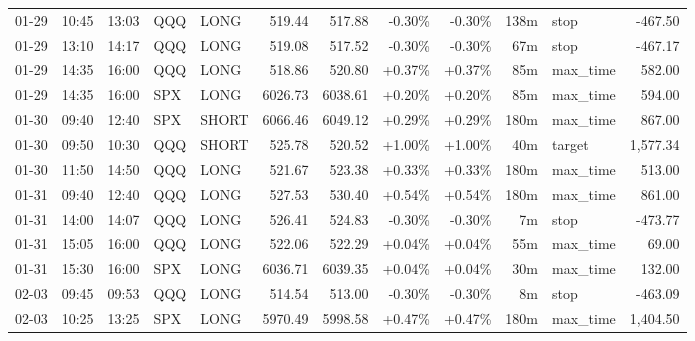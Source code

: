 \documentclass[11pt,a4paper,twoside]{article}
\begin{document}
\begin{center}
\begin{longtable}{>{\color{txtmain}}l l l l l r r r r r >{\color{txtmain}}l r}
01-29 & 10:45 & 13:03 & QQQ & LONG & 519.44 & 517.88 & \textcolor{lossred}{-0.30\%} & \textcolor{lossred}{-0.30\%} & 138m & stop & \textcolor{lossred}{-467.50} \\
01-29 & 13:10 & 14:17 & QQQ & LONG & 519.08 & 517.52 & \textcolor{lossred}{-0.30\%} & \textcolor{lossred}{-0.30\%} & 67m & stop & \textcolor{lossred}{-467.17} \\
01-29 & 14:35 & 16:00 & QQQ & LONG & 518.86 & 520.80 & \textcolor{wingreen}{+0.37\%} & \textcolor{wingreen}{+0.37\%} & 85m & max\_time & \textcolor{wingreen}{582.00} \\
01-29 & 14:35 & 16:00 & SPX & LONG & 6026.73 & 6038.61 & \textcolor{wingreen}{+0.20\%} & \textcolor{wingreen}{+0.20\%} & 85m & max\_time & \textcolor{wingreen}{594.00} \\
01-30 & 09:40 & 12:40 & SPX & SHORT & 6066.46 & 6049.12 & \textcolor{wingreen}{+0.29\%} & \textcolor{wingreen}{+0.29\%} & 180m & max\_time & \textcolor{wingreen}{867.00} \\
01-30 & 09:50 & 10:30 & QQQ & SHORT & 525.78 & 520.52 & \textcolor{wingreen}{+1.00\%} & \textcolor{wingreen}{+1.00\%} & 40m & target & \textcolor{wingreen}{1,577.34} \\
01-30 & 11:50 & 14:50 & QQQ & LONG & 521.67 & 523.38 & \textcolor{wingreen}{+0.33\%} & \textcolor{wingreen}{+0.33\%} & 180m & max\_time & \textcolor{wingreen}{513.00} \\
01-31 & 09:40 & 12:40 & QQQ & LONG & 527.53 & 530.40 & \textcolor{wingreen}{+0.54\%} & \textcolor{wingreen}{+0.54\%} & 180m & max\_time & \textcolor{wingreen}{861.00} \\
01-31 & 14:00 & 14:07 & QQQ & LONG & 526.41 & 524.83 & \textcolor{lossred}{-0.30\%} & \textcolor{lossred}{-0.30\%} & 7m & stop & \textcolor{lossred}{-473.77} \\
01-31 & 15:05 & 16:00 & QQQ & LONG & 522.06 & 522.29 & \textcolor{wingreen}{+0.04\%} & \textcolor{wingreen}{+0.04\%} & 55m & max\_time & \textcolor{wingreen}{69.00} \\
01-31 & 15:30 & 16:00 & SPX & LONG & 6036.71 & 6039.35 & \textcolor{wingreen}{+0.04\%} & \textcolor{wingreen}{+0.04\%} & 30m & max\_time & \textcolor{wingreen}{132.00} \\
02-03 & 09:45 & 09:53 & QQQ & LONG & 514.54 & 513.00 & \textcolor{lossred}{-0.30\%} & \textcolor{lossred}{-0.30\%} & 8m & stop & \textcolor{lossred}{-463.09} \\
02-03 & 10:25 & 13:25 & SPX & LONG & 5970.49 & 5998.58 & \textcolor{wingreen}{+0.47\%} & \textcolor{wingreen}{+0.47\%} & 180m & max\_time & \textcolor{wingreen}{1,404.50} \\

\end{longtable}
\end{center}
\end{document}
